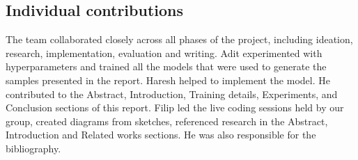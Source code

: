 \documentclass{article}
\begin{document}
\subsection{Individual contributions}
The team collaborated closely across all phases of the project, including ideation, research, implementation, evaluation and writing. Adit experimented with hyperparameters and trained all the models that were used to generate the samples presented in the report. Haresh helped to implement the model. He contributed to the Abstract, Introduction, Training details, Experiments, and Conclusion sections of this report. Filip led the live coding sessions held by our group, created diagrams from sketches, referenced research in the Abstract, Introduction and Related works sections. He was also responsible for the bibliography.









\end{document}
